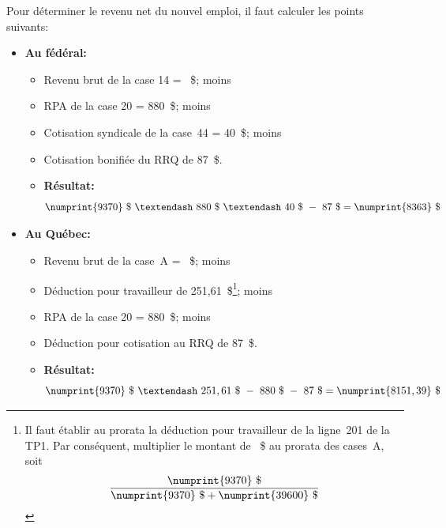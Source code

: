 Pour déterminer le revenu net du nouvel emploi, il faut calculer les points suivants:
\begin{itemize}
	\item \textbf{Au fédéral:}
	\begin{itemize}
		\item Revenu brut de la case 14 = ~\$;  moins
		\item RPA de la case 20 = 880~\$;  moins
		\item Cotisation syndicale de la case~44 = 40~\$;  moins
		\item Cotisation bonifiée du RRQ de 87~\$. 
		\item \textbf{Résultat:} \[ \numprint{9370}~\$~–~880~\$~–~40~\$~-~87~\$ = \numprint{8 363}~\$ \]
	\end{itemize}
	\item \textbf{Au Québec:}
	\begin{itemize}
		\item Revenu brut de la case~A = ~\$;  moins
		\item Déduction pour travailleur de 251,61~\$\footnote{Il faut établir au prorata la déduction pour travailleur de la ligne~201 de la TP1. Par conséquent, multiplier le montant de ~\$ au prorata des cases~A, soit \[ \frac{\numprint{9370}~\$}{\numprint{9370}~\$ + \numprint{39600}~\$} \]};  moins                                                                                                                               
		\item RPA de la case 20 = 880~\$;  moins
		\item Déduction pour cotisation au RRQ de 87~\$. 
		\item \textbf{Résultat:} \[ \numprint{9370}~\$~–~251,61~\$~-~880~\$~-~87~\$ = \numprint{8151,39}~\$ \]
	\end{itemize}
\end{itemize}

